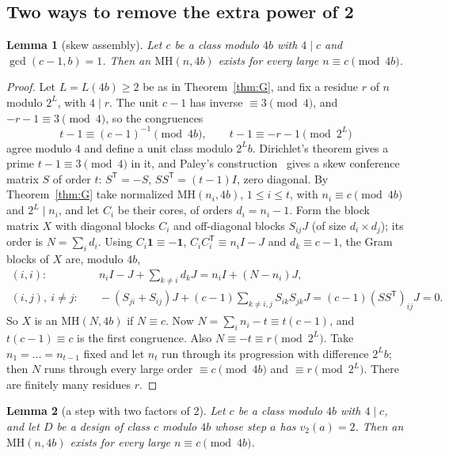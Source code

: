 \documentclass[10pt]{article}
\newtheorem{lemma}{Lemma}
\theoremstyle{remark}
\newcommand{\MH}{\mathrm{MH}}
\newcommand{\tr}{^{\mathsf T}}
\newcommand{\one}{\mathbf 1}
\begin{document}
\subsection{Two ways to remove the extra power of 2}
\begin{lemma}[skew assembly]\label{lem:skew}
Let $c$ be a class modulo $4b$ with $4\mid c$ and $\gcd(c-1,b)=1$. Then an $\MH(n,4b)$ exists for every large $n\equiv c\pmod{4b}$.
\end{lemma}

\begin{proof}
Let $L=L(4b)\ge2$ be as in Theorem~\ref{thm:G}, and fix a residue $r$ of $n$ modulo $2^L$, with $4\mid r$. The unit $c-1$ has inverse $\equiv3\pmod4$, and $-r-1\equiv3\pmod 4$, so the congruences
\[
t-1\equiv(c-1)^{-1}\pmod{4b},\qquad t-1\equiv-r-1\pmod{2^L}
\]
agree modulo $4$ and define a unit class modulo $2^Lb$. Dirichlet's theorem gives a prime $t-1\equiv3\pmod4$ in it, and Paley's construction~\cite{Pa33} gives a skew conference matrix $S$ of order $t$: $S\tr=-S$, $SS\tr=(t-1)I$, zero diagonal. By Theorem~\ref{thm:G} take normalized $\MH(n_i,4b)$, $1\le i\le t$, with $n_i\equiv c\pmod{4b}$ and $2^L\mid n_i$, and let $C_i$ be their cores, of orders $d_i=n_i-1$. Form the block matrix $X$ with diagonal blocks $C_i$ and off-diagonal blocks $S_{ij}J$ (of size $d_i\times d_j$); its order is $N=\sum_id_i$. Using $C_i\one\equiv-\one$, $C_iC_i\tr\equiv n_iI-J$ and $d_k\equiv c-1$, the Gram blocks of $X$ are, modulo $4b$,
\begin{align*}
(i,i):&\quad n_iI-J+\textstyle\sum_{k\ne i}d_kJ=n_iI+(N-n_i)J,\\
(i,j),\ i\ne j:&\quad -(S_{ji}+S_{ij})J+(c-1)\textstyle\sum_{k\ne i,j}S_{ik}S_{jk}J=(c-1)(SS\tr)_{ij}J=0.
\end{align*}
So $X$ is an $\MH(N,4b)$ if $N\equiv c$. Now $N=\sum_in_i-t\equiv t(c-1)$, and $t(c-1)\equiv c$ is the first congruence. Also $N\equiv-t\equiv r\pmod{2^L}$. Take $n_1=\dots=n_{t-1}$ fixed and let $n_t$ run through its progression with difference $2^Lb$; then $N$ runs through every large order $\equiv c\pmod{4b}$ and $\equiv r\pmod{2^L}$. There are finitely many residues $r$.
\end{proof}

\begin{lemma}[a step with two factors of 2]\label{lem:v2two}
Let $c$ be a class modulo $4b$ with $4\mid c$, and let $D$ be a design of class $c$ modulo $4b$ whose step $a$ has $v_2(a)=2$. Then an $\MH(n,4b)$ exists for every large $n\equiv c\pmod{4b}$.
\end{lemma}
\end{document}
